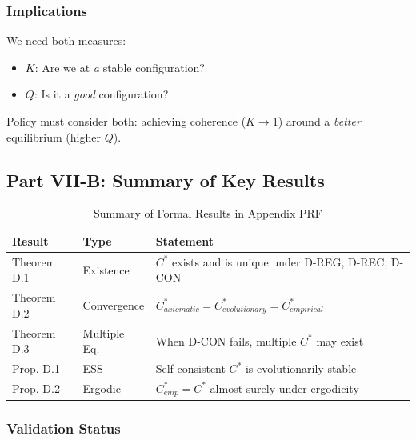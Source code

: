 \subsubsection{Implications}

We need both measures:
\begin{itemize}[nosep]
    \item $K$: Are we at \emph{a} stable configuration?
    \item $Q$: Is it a \emph{good} configuration?
\end{itemize}

Policy must consider both: achieving coherence ($K \to 1$) around a
\emph{better} equilibrium (higher $Q$).



\subsection{Part VII-B: Summary of Key Results}
\label{sec:D-results}

\begin{table}[htbp]
\centering
\caption{Summary of Formal Results in Appendix PRF}
\label{tab:D-results}
\renewcommand{\arraystretch}{1.2}
\begin{tabular}{@{}llp{6cm}@{}}
\toprule
\textbf{Result} & \textbf{Type} & \textbf{Statement} \\
\midrule
Theorem D.1 & Existence & $C^*$ exists and is unique under D-REG, D-REC, D-CON \\
Theorem D.2 & Convergence & $C^*_{axiomatic} = C^*_{evolutionary} = C^*_{empirical}$ \\
Theorem D.3 & Multiple Eq. & When D-CON fails, multiple $C^*$ may exist \\
Prop. D.1 & ESS & Self-consistent $C^*$ is evolutionarily stable \\
Prop. D.2 & Ergodic & $C^*_{emp} = C^*$ almost surely under ergodicity \\
\bottomrule
\end{tabular}
\end{table}

\subsubsection{Validation Status}

